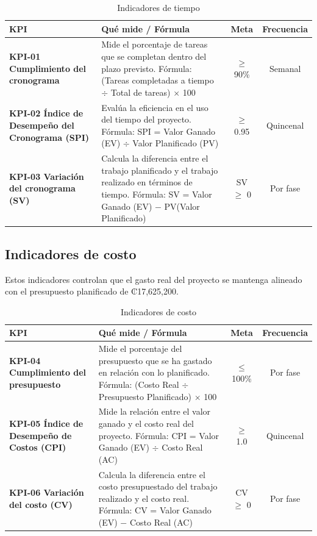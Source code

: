 \documentclass[11pt,spanish]{article}
\begin{document}
\begin{table}[H]
\centering
\small
\caption{Indicadores de tiempo}\label{tab:indicadores-tiempo}
\begin{tabularx}{\textwidth}{p{4.5cm} Y c c}
\toprule
\textbf{KPI} & \textbf{Qué mide / Fórmula} & \textbf{Meta} & \textbf{Frecuencia} \\
\midrule
\textbf{KPI-01 Cumplimiento del cronograma} & Mide el porcentaje de tareas que se completan dentro del plazo previsto. Fórmula: (Tareas completadas a tiempo $\div$ Total de tareas) $\times$ 100 & $\geq$ 90\% & Semanal \\
\textbf{KPI-02 Índice de Desempeño del Cronograma (SPI)} & Evalúa la eficiencia en el uso del tiempo del proyecto. Fórmula: SPI = Valor Ganado (EV) $\div$ Valor Planificado (PV) & $\geq$ 0.95 & Quincenal \\
\textbf{KPI-03 Variación del cronograma (SV)} & Calcula la diferencia entre el trabajo planificado y el trabajo realizado en términos de tiempo. Fórmula: SV = Valor Ganado (EV) $-$ PV(Valor Planificado) & SV $\geq$ 0 & Por fase \\
\bottomrule
\end{tabularx}
\end{table}

\subsection{Indicadores de costo}

Estos indicadores controlan que el gasto real del proyecto se mantenga alineado con el presupuesto planificado de ₡17,625,200.

\begin{table}[H]
\centering
\small
\caption{Indicadores de costo}\label{tab:indicadores-costo}
\begin{tabularx}{\textwidth}{p{4.5cm} Y c c}
\toprule
\textbf{KPI} & \textbf{Qué mide / Fórmula} & \textbf{Meta} & \textbf{Frecuencia} \\
\midrule
\textbf{KPI-04 Cumplimiento del presupuesto} & Mide el porcentaje del presupuesto que se ha gastado en relación con lo planificado. Fórmula: (Costo Real $\div$ Presupuesto Planificado) $\times$ 100 & $\leq$ 100\% & Por fase \\
\textbf{KPI-05 Índice de Desempeño de Costos (CPI)} & Mide la relación entre el valor ganado y el costo real del proyecto. Fórmula: CPI = Valor Ganado (EV) $\div$ Costo Real (AC) & $\geq$ 1.0 & Quincenal \\
\textbf{KPI-06 Variación del costo (CV)} & Calcula la diferencia entre el costo presupuestado del trabajo realizado y el costo real. Fórmula: CV = Valor Ganado (EV) $-$ Costo Real (AC) & CV $\geq$ 0 & Por fase \\
\bottomrule
\end{tabularx}
\end{table}
\end{document}
